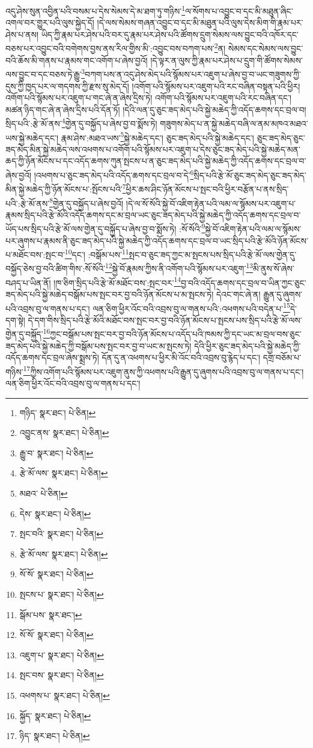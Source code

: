 འདུ་ཤེས་སུན་འབྱིན་པའི་བསམ་པ་དེས་སེམས་དེ་མ་ཐག་ཏུ་གཉིས་\footnote{གཉིད་  སྣར་ཐང་།  པེ་ཅིན། }ལ་སོགས་པ་འབྱུང་བ་དང་མི་མཐུན་ཞིང་འགལ་བར་གྱུར་པའི་ལུས་སྐྱེད་དོ། །དེ་ལས་སེམས་གཞན་འབྱུང་བ་དང་མི་མཐུན་པའི་ལུས་དེས་མིག་གི་རྣམ་པར་ཤེས་པ་ནས། ཡིད་ཀྱི་རྣམ་པར་ཤེས་པའི་བར་དུ་རྣམ་པར་ཤེས་པའི་ཚོགས་དྲུག་སེམས་ལས་བྱུང་བའི་འཁོར་དང་བཅས་པར་འབྱུང་བའི་བགེགས་བྱས་ནས་རིལ་གྱིས་མི་:འབྱུང་བས་བཀག་པས་\footnote{འབྱུང་ནས་  སྣར་ཐང་།  པེ་ཅིན། }ན། སེམས་དང་སེམས་ལས་བྱུང་བའི་ཆོས་མི་གནས་པ་རྣམས་གང་འགོག་པ་ཞེས་བྱའོ། །དེ་ལྟར་ན་ལུས་ཀྱི་རྣམ་པར་ཤེས་པ་དྲུག་གི་ཚོགས་སེམས་ལས་བྱུང་བ་དང་བཅས་ཏེ་རྒྱུ་\footnote{རྒྱུ་བ་  སྣར་ཐང་།  པེ་ཅིན། }བཀག་པས་ན་འདུ་ཤེས་མེད་པའི་སྙོམས་པར་འཇུག་པ་ཞེས་བྱ་བ་ཡང་གཟུགས་ཀྱི་དུས་ཀྱི་ཁྱད་པར་ལ་གདགས་ཀྱི་རྫས་སུ་མེད་དོ། །འགོག་པའི་སྙོམས་པར་འཇུག་པའི་རང་བཞིན་བསྟན་པའི་ཕྱིར། འགོག་པའི་སྙོམས་པར་འཇུག་པ་གང་ཞེ་ན་ཞེས་དྲིས་ཏེ། འགོག་པའི་སྙོམས་པར་འཇུག་པའི་རང་བཞིན་དང་། མཚན་ཉིད་གང་ཞེ་ན་ཞེས་དྲིས་པའི་དོན་ཏོ། །དེའི་ལན་དུ་ཅུང་ཟད་མེད་པའི་སྐྱེ་མཆེད་ཀྱི་འདོད་ཆགས་དང་བྲལ་བ། སྲིད་པའི་:རྩེ་མོ་ནས་\footnote{རྩེ་མོ་ལས་  སྣར་ཐང་།  པེ་ཅིན། }གྱེན་དུ་བསྐྱོད་པ་ཞེས་བྱ་བ་སྨོས་ཏེ། གཟུགས་མེད་པ་ན་སྐྱེ་མཆེད་བཞི་ལ་ནམ་མཁའ་མཐའ་ཡས་སྐྱེ་མཆེད་དང་། རྣམ་ཤེས་:མཐའ་ཡས་\footnote{མཐའ་  པེ་ཅིན། }སྐྱེ་མཆེད་དང་། ཅུང་ཟད་མེད་པའི་སྐྱེ་མཆེད་དང་། ཅུང་ཟད་མེད་ཅུང་ཟད་མེད་མིན་སྐྱེ་མཆེད་ལས་འཕགས་པ་འགོག་པའི་སྙོམས་པར་འཇུག་པ་དེས་ཅུང་ཟད་མེད་པའི་སྐྱེ་མཆེད་མན་ཆད་ཀྱི་ཉོན་མོངས་པ་དང་འདོད་ཆགས་ཀུན་སྤངས་པ་ན་ཅུང་ཟད་མེད་པའི་སྐྱེ་མཆེད་ཀྱི་འདོད་ཆགས་དང་བྲལ་བ་ཞེས་བྱའོ། །འཕགས་པ་ཅུང་ཟད་མེད་པའི་འདོད་ཆགས་དང་བྲལ་བ་དེ་\footnote{དེས་  སྣར་ཐང་།  པེ་ཅིན། }སྲིད་པའི་རྩེ་མོ་ཅུང་ཟད་མེད་ཅུང་ཟད་མེད་མིན་སྐྱེ་མཆེད་ཀྱི་ཉོན་མོངས་པ་:སྤོངས་པའི་\footnote{སྤང་བའི་  སྣར་ཐང་།  པེ་ཅིན། }ཕྱིར་ཆས་ཤིང་ཉོན་མོངས་པ་སྤང་བའི་ཕྱིར་བརྩོན་པ་ནས་སྲིད་པའི་:རྩེ་མོ་ནས་\footnote{རྩེ་མོ་ལས་  སྣར་ཐང་།  པེ་ཅིན། }གྱེན་དུ་བསྐྱོད་པ་ཞེས་བྱའོ། །དེ་ལ་སོ་སོའི་སྐྱེ་བོ་འཇིག་རྟེན་པའི་ལམ་ལ་སྙོམས་པར་འཇུག་པ་རྣམས་སྲིད་པའི་རྩེ་མོའི་འདོད་ཆགས་དང་མ་བྲལ་ཡང་ཅུང་ཟད་མེད་པའི་སྐྱེ་མཆེད་ཀྱི་འདོད་ཆགས་དང་བྲལ་བ་ཡོད་པས་སྲིད་པའི་རྩེ་མོ་ལས་གྱེན་དུ་བསྐྱོད་པ་ཞེས་བྱ་བ་སྨོས་ཏེ། :སོ་སོའི་\footnote{སོ་སོ་  སྣར་ཐང་།  པེ་ཅིན། }སྐྱེ་བོ་འཇིག་རྟེན་པའི་ལམ་ལ་སྙོམས་པར་ཞུགས་པ་རྣམས་ནི་ཅུང་ཟད་མེད་པའི་སྐྱེ་མཆེད་ཀྱི་འདོད་ཆགས་དང་བྲལ་བ་ཡང་སྲིད་པའི་རྩེ་མོའི་ཉོན་མོངས་པ་མཐོང་བས་:སྤང་བ་\footnote{སྤངས་པ་  སྣར་ཐང་།  པེ་ཅིན། }དང་། :བསྒོམ་པས་\footnote{སྒོམ་པས་  སྣར་ཐང་། }སྤང་བ་ཅུང་ཟད་ཀྱང་མ་སྤངས་པས་སྲིད་པའི་རྩེ་མོ་ལས་གྱེན་དུ་བསྐྱོད་ཅེས་བྱ་བའི་ཚིག་གིས་:སོ་སོའི་\footnote{སོ་སོ་  སྣར་ཐང་།  པེ་ཅིན། }སྐྱེ་བོ་རྣམས་ཀྱིས་ནི་འགོག་པའི་སྙོམས་པར་འཇུག་\footnote{འཇུག་པ་  སྣར་ཐང་།  པེ་ཅིན། }མི་ནུས་སོ་ཞེས་བཤད་པ་ཡིན་ནོ། །ཁ་ཅིག་སྲིད་པའི་རྩེ་མོ་མཐོང་བས་:སྤང་བར་\footnote{སྤང་བས་  སྣར་ཐང་།  པེ་ཅིན། }བྱ་བའི་འདོད་ཆགས་དང་བྲལ་བ་ཡིན་ཀྱང་ཅུང་ཟད་མེད་པའི་སྐྱེ་མཆེད་བསྒོམ་པས་སྤང་བར་བྱ་བའི་ཉོན་མོངས་པ་མ་སྤངས་ཏེ། དེའང་གང་ཞེ་ན། རྒྱུན་དུ་ཞུགས་པའི་འབྲས་བུ་ལ་གནས་པ་དང་། ལན་ཅིག་ཕྱིར་འོང་བའི་འབྲས་བུ་ལ་གནས་པའི་:འཕགས་པའི་བདེན་པ་\footnote{འཕགས་པ་  སྣར་ཐང་།  པེ་ཅིན། }དེ་དག་སྟེ། དེ་དག་གིས་སྲིད་པའི་རྩེ་མོའི་མཐོང་བས་སྤང་བར་བྱ་བའི་ཉོན་མོངས་པ་སྤངས་པས་སྲིད་པའི་རྩེ་མོ་ལས་གྱེན་དུ་བསྐྱོད་\footnote{སྐྱོད་  སྣར་ཐང་།  པེ་ཅིན། }ཀྱང་བསྒོམ་པས་སྤང་བར་བྱ་བའི་ཉོན་མོངས་པ་འདོད་པའི་ཁམས་ཀྱི་དང་ཡང་མ་བྲལ་བས་ཅུང་ཟད་མེད་པའི་སྐྱེ་མཆེད་ཀྱི་བསྒོམ་པས་སྤང་བར་བྱ་བ་ཡང་མ་སྤངས་ཏེ། དེའི་ཕྱིར་ཅུང་ཟད་མེད་པའི་སྐྱེ་མཆེད་ཀྱི་འདོད་ཆགས་དང་བྲལ་ཞེས་སྨྲས་ཏེ། དོན་དུ་ན་འཕགས་པ་ཕྱིར་མི་འོང་བའི་འབྲས་བུ་རྙེད་པ་དང་། དགྲ་བཅོམ་པ་གཉིས་\footnote{ཉིད་  སྣར་ཐང་།  པེ་ཅིན། }ཀྱིས་འགོག་པའི་སྙོམས་པར་འཇུག་ནུས་ཀྱི་འཕགས་པའི་རྒྱུན་དུ་ཞུགས་པའི་འབྲས་བུ་ལ་གནས་པ་དང་། ལན་ཅིག་ཕྱིར་འོང་བའི་འབྲས་བུ་ལ་གནས་པ་དང་། 